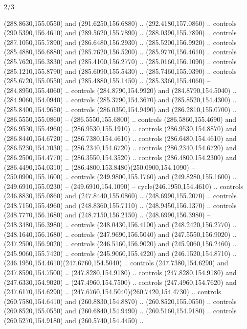 \begin{flagdescription}{2/3}
\begin{scope}[xshift=0.5\flaglength,yshift=0.5\flagwidth,scale=\flagwidth/259.2]
\begin{scope}[y=0.8pt, x=0.8pt, yscale=-1,shift={(-243,-162)}]
      (288.8630,155.0550) and (291.6250,156.6880) .. (292.4180,157.0860) .. controls
      (290.5390,156.4610) and (289.5620,155.7890) .. (288.0390,155.7890) .. controls
      (287.1050,155.7890) and (286.6480,156.2930) .. (285.5200,156.9920) .. controls
      (285.4880,156.6880) and (285.7620,156.5200) .. (285.9770,156.4610) .. controls
      (285.7620,156.3830) and (285.4100,156.2770) .. (285.0160,156.1090) .. controls
      (285.1210,155.8790) and (285.6090,155.5430) .. (285.7460,155.0390) .. controls
      (285.6720,155.0550) and (285.4880,155.1450) .. (285.3360,155.4060) --
      (284.8950,155.4060) .. controls (284.8790,154.9920) and (284.8790,154.5040) ..
      (284.9060,154.0940) .. controls (285.3790,154.3670) and (285.8520,154.4300) ..
      (285.8400,154.9650) .. controls (286.0350,154.9490) and (286.2810,155.0700) ..
      (286.5550,155.0860) -- (286.5550,155.6800) .. controls (286.5860,155.4690) and
      (286.9530,155.4960) .. (286.9530,155.1910) .. controls (286.9530,154.8870) and
      (286.8440,154.6720) .. (286.7380,154.4610) .. controls (286.6480,154.4610) and
      (286.5230,154.7030) .. (286.2340,154.6720) .. controls (286.2340,154.6720) and
      (286.2500,154.4770) .. (286.3550,154.3520) .. controls (286.4800,154.2300) and
      (286.4490,154.0310) .. (286.4800,153.8480)(250.0900,154.1090) --
      (250.0900,155.1600) .. controls (249.9800,155.1760) and (249.8280,155.1600) ..
      (249.6910,155.0230) -- (249.6910,154.1090) -- cycle(246.1950,154.4610) ..
      controls (246.8830,155.0860) and (247.8440,155.0860) .. (248.6990,155.2070) ..
      controls (248.7150,155.4960) and (248.8360,155.7110) .. (248.9450,156.1370) ..
      controls (248.7770,156.1680) and (248.7150,156.2150) .. (248.6990,156.3980) --
      (248.3480,156.3980) .. controls (248.0430,156.4100) and (248.2420,156.2770) ..
      (248.1640,156.1680) .. controls (247.9690,156.5040) and (247.5550,156.9020) ..
      (247.2500,156.9020) .. controls (246.5160,156.9020) and (245.9060,156.2460) ..
      (245.9060,155.7420) .. controls (245.9060,155.4220) and (246.1520,154.8710) ..
      (246.1950,154.4610)(247.6760,154.5040) .. controls (247.7380,154.6290) and
      (247.8590,154.7500) .. (247.8280,154.9180) .. controls (247.8280,154.9180) and
      (247.6330,154.9020) .. (247.4960,154.7500) .. controls (247.4960,154.7620) and
      (247.6170,154.6290) .. (247.6760,154.5040)(260.7420,154.4730) .. controls
      (260.7580,154.6410) and (260.8830,154.8870) .. (260.8520,155.0550) .. controls
      (260.8520,155.0550) and (260.6840,154.9490) .. (260.5160,154.9180) .. controls
      (260.5270,154.9180) and (260.5740,154.4450) ..

\end{scope}
\end{scope}
\end{flagdescription}
